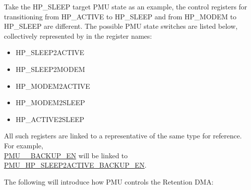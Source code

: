 \documentclass[main\_\_EN.tex]{subfiles}
\begin{document}
Take the HP\_SLEEP target PMU state as an example, the control registers for transitioning from HP\_ACTIVE to HP\_SLEEP and from HP\_MODEM to HP\_SLEEP are different. The possible PMU state switches are listed below, collectively represented by  in the register names:

\begin{itemize}
    \item HP\_SLEEP2ACTIVE
    \item HP\_SLEEP2MODEM
    \item HP\_MODEM2ACTIVE
    \item HP\_MODEM2SLEEP
    \item HP\_ACTIVE2SLEEP
\end{itemize}

All such registers are linked to a representative of the same type for reference. For example, \\
\hyperref[fielddesc:PMUHPSLEEP2ACTIVEBACKUPEN]{PMU\_\_BACKUP\_EN}
will be linked to
\hyperref[fielddesc:PMUHPSLEEP2ACTIVEBACKUPEN]{PMU\_HP\_SLEEP2ACTIVE\_BACKUP\_EN}.

The following will introduce how PMU controls the Retention DMA:
\end{document}
